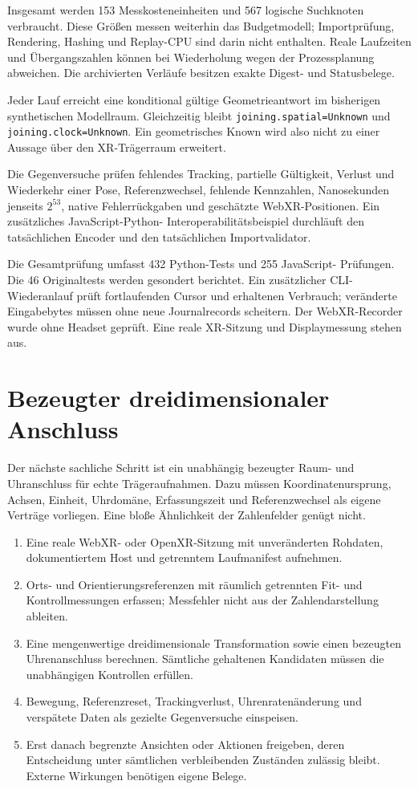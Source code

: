 \documentclass[11pt,a4paper]{article}
\newcommand{\nextsection}[2]{\clearpage{\color{accent}\small\textsf{#1}}\section{#2}}
\begin{document}
Insgesamt werden 153 Messkosteneinheiten und 567 logische
Suchknoten verbraucht. Diese Größen messen weiterhin das
Budgetmodell; Importprüfung, Rendering, Hashing und Replay-CPU
sind darin nicht enthalten. Reale Laufzeiten und Übergangszahlen
können bei Wiederholung wegen der Prozessplanung abweichen.
Die archivierten Verläufe besitzen exakte Digest- und Statusbelege.

Jeder Lauf erreicht eine konditional gültige Geometrieantwort
im bisherigen synthetischen Modellraum. Gleichzeitig bleibt
\texttt{joining.spatial=Unknown} und
\texttt{joining.clock=Unknown}. Ein geometrisches Known wird
also nicht zu einer Aussage über den XR-Trägerraum erweitert.

Die Gegenversuche prüfen fehlendes Tracking, partielle Gültigkeit,
Verlust und Wiederkehr einer Pose, Referenzwechsel, fehlende
Kennzahlen, Nanosekunden jenseits $2^{53}$, native Fehlerrückgaben
und geschätzte WebXR-Positionen. Ein zusätzliches JavaScript-Python-
Interoperabilitätsbeispiel durchläuft den tatsächlichen Encoder
und den tatsächlichen Importvalidator.

Die Gesamtprüfung umfasst 432 Python-Tests und 255 JavaScript-
Prüfungen. Die 46 Originaltests werden gesondert berichtet.
Ein zusätzlicher CLI-Wiederanlauf prüft fortlaufenden Cursor und
erhaltenen Verbrauch; veränderte Eingabebytes müssen ohne neue
Journalrecords scheitern. Der WebXR-Recorder wurde ohne Headset
geprüft. Eine reale XR-Sitzung und Displaymessung stehen aus.

\nextsection{89 / NÄCHSTE STUFE}{Bezeugter dreidimensionaler Anschluss}
Der nächste sachliche Schritt ist ein unabhängig bezeugter Raum-
und Uhranschluss für echte Trägeraufnahmen. Dazu müssen
Koordinatenursprung, Achsen, Einheit, Uhrdomäne, Erfassungszeit
und Referenzwechsel als eigene Verträge vorliegen. Eine bloße
Ähnlichkeit der Zahlenfelder genügt nicht.

\begin{enumerate}
\item Eine reale WebXR- oder OpenXR-Sitzung mit unveränderten
Rohdaten, dokumentiertem Host und getrenntem Laufmanifest aufnehmen.
\item Orts- und Orientierungsreferenzen mit räumlich getrennten
Fit- und Kontrollmessungen erfassen; Messfehler nicht aus der
Zahlendarstellung ableiten.
\item Eine mengenwertige dreidimensionale Transformation sowie
einen bezeugten Uhrenanschluss berechnen. Sämtliche gehaltenen
Kandidaten müssen die unabhängigen Kontrollen erfüllen.
\item Bewegung, Referenzreset, Trackingverlust, Uhrenratenänderung
und verspätete Daten als gezielte Gegenversuche einspeisen.
\item Erst danach begrenzte Ansichten oder Aktionen freigeben,
deren Entscheidung unter sämtlichen verbleibenden Zuständen
zulässig bleibt. Externe Wirkungen benötigen eigene Belege.
\end{enumerate}
\end{document}
